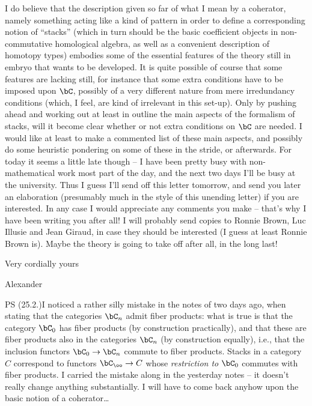 I do believe that the description given so far of what I mean by a
coherator, namely something acting like a kind of pattern in order to
define a corresponding notion of ``stacks'' (which in turn should be
the basic coefficient objects in non-commutative homological algebra,
as well as a convenient description of homotopy types) embodies some
of the essential features of the theory still in embryo that wants to
be developed. It is quite possible of course that some features are
lacking still, for instance that some extra conditions have to be
imposed upon $\bC$, possibly of a very different nature from mere
irredundancy conditions (which, I feel, are kind of irrelevant in this
set-up). Only by pushing ahead and working out at least in outline the
main aspects of the formalism of stacks, will it become clear whether
or not extra conditions on $\bC$ are needed. I would like at least
to make a commented list of these main aspects, and possibly do some
heuristic pondering on some of these in the stride, or afterwards. For
today it seems a little late though -- I have been pretty busy with
non-mathematical work most part of the day, and the next two days I'll
be busy at the university. Thus I guess I'll send off this letter
tomorrow, and send you later an elaboration (presumably much in the
style of this unending letter) if you are interested. In any case I
would appreciate any comments you make -- that's why I have been
writing you after all! I will probably send copies to Ronnie Brown,
Luc Illusie and Jean Giraud, in case they should be interested (I
guess at least Ronnie Brown is). Maybe the theory is going to take off
after all, in the long last!

\bigskip

Very cordially yours

\bigskip

\hfill Alexander

\bigskip

PS (25.2.)\enspace I noticed a rather silly mistake in the notes of two days
ago, when stating that the categories $\bC_n$ admit fiber products:
what is true is that the category $\bC_0$ has fiber products (by
construction practically), and that these are fiber products also in
the categories $\bC_n$ (by construction equally), i.e., that the
inclusion functors $\bC_0 \to \bC_n$ commute to fiber
products. Stacks in a category $C$ correspond to functors $\bC_\oo\to
C$ whose \emph{restriction to} $\bC_0$ commutes with fiber
products. I carried the mistake along in the yesterday notes -- it
doesn't really change anything substantially. I will have to come back
anyhow upon the basic notion of a coherator\ldots











